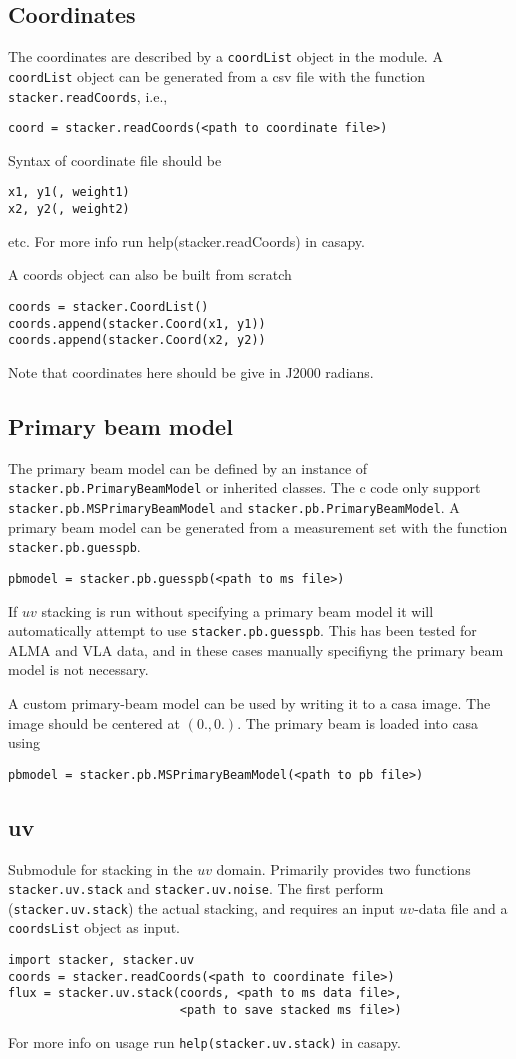 \documentclass{article}
\begin{document}
\subsection{Coordinates}
The coordinates are described by a {\tt coordList} object in the module.
A {\tt coordList} object can be generated from a csv file with the function {\tt stacker.readCoords},
i.e.,
\begin{verbatim}
coord = stacker.readCoords(<path to coordinate file>)
\end{verbatim}
Syntax of coordinate file should be
\begin{verbatim}
x1, y1(, weight1)
x2, y2(, weight2)
\end{verbatim}
etc. For more info run help(stacker.readCoords) in casapy.


A coords object can also be built from scratch
\begin{verbatim}
coords = stacker.CoordList()
coords.append(stacker.Coord(x1, y1))
coords.append(stacker.Coord(x2, y2))
\end{verbatim}
Note that coordinates here should be give in J2000 radians.

\subsection{Primary beam model}
\label{sec:pb}
The primary beam model can be defined by an instance of 
{\tt stacker.pb.PrimaryBeamModel} or inherited classes. The c code only support
{\tt stacker.pb.MSPrimaryBeamModel} and {\tt stacker.pb.PrimaryBeamModel}. 
A primary beam model can be generated from a measurement set with the function
{\tt stacker.pb.guesspb}.
\begin{verbatim}
pbmodel = stacker.pb.guesspb(<path to ms file>)
\end{verbatim}
If $uv$ stacking is run without specifying a primary beam model it will automatically attempt to use {\tt stacker.pb.guesspb}.
This has been tested for ALMA and VLA data, 
and in these cases manually specifiyng the primary beam model is not necessary.

A custom primary-beam model can be used by writing it to a casa image.
The image should be centered at $(0., 0.)$.
The primary beam is loaded into casa using
\begin{verbatim}
pbmodel = stacker.pb.MSPrimaryBeamModel(<path to pb file>)
\end{verbatim}


\subsection{uv}
Submodule for stacking in the $uv$ domain. 
Primarily provides two functions {\tt stacker.uv.stack} and {\tt stacker.uv.noise}.
The first perform ({\tt stacker.uv.stack}) the actual stacking, 
and requires an input $uv$-data file and a {\tt coordsList} object as input.
\begin{verbatim}
import stacker, stacker.uv
coords = stacker.readCoords(<path to coordinate file>)
flux = stacker.uv.stack(coords, <path to ms data file>, 
                        <path to save stacked ms file>)
\end{verbatim}
For more info on usage run {\tt help(stacker.uv.stack)} in casapy.
\end{document}
